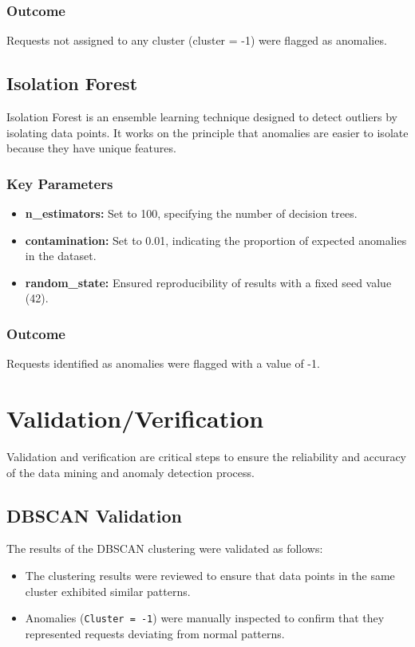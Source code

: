 \subsubsection{Outcome}
Requests not assigned to any cluster (cluster = -1) were flagged as anomalies.

\subsection{Isolation Forest}
Isolation Forest is an ensemble learning technique designed to detect outliers by isolating data points. It works on the principle that anomalies are easier to isolate because they have unique features.
\subsubsection{Key Parameters}
\begin{itemize}
	\item \textbf{n\_estimators:} Set to 100, specifying the number of decision trees.
	\item \textbf{contamination:} Set to 0.01, indicating the proportion of expected anomalies in the dataset.
	\item \textbf{random\_state:} Ensured reproducibility of results with a fixed seed value (42).
\end{itemize}
\subsubsection{Outcome}
Requests identified as anomalies were flagged with a value of -1.

\section{Validation/Verification}
Validation and verification are critical steps to ensure the reliability and accuracy of the data mining and anomaly detection process.
\subsection{DBSCAN Validation}
The results of the DBSCAN clustering were validated as follows:
\begin{itemize}
	\item The clustering results were reviewed to ensure that data points in the same cluster exhibited similar patterns.
	\item Anomalies (\texttt{Cluster = -1}) were manually inspected to confirm that they represented requests deviating from normal patterns.
\end{itemize}

